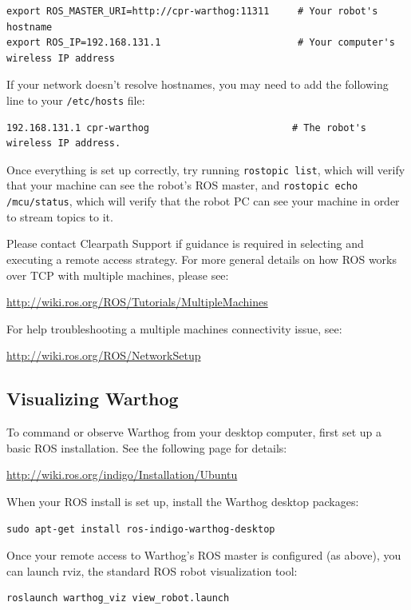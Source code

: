 \documentclass[]{clearpath-latex/clearpath-manual}
\begin{document}
\begin{lstlisting}
export ROS_MASTER_URI=http://cpr-warthog:11311     # Your robot's hostname
export ROS_IP=192.168.131.1                        # Your computer's wireless IP address
\end{lstlisting}

If your network doesn't resolve hostnames, you may need to add the following line to your \lstinline{/etc/hosts} file:

\begin{lstlisting}
192.168.131.1 cpr-warthog                         # The robot's wireless IP address.
\end{lstlisting}

Once everything is set up correctly, try running \lstinline{rostopic list}, which will verify that your machine can see the robot's ROS master, and \lstinline{rostopic echo /mcu/status}, which will verify that the robot PC can see your machine in order to stream topics to it.

Please contact Clearpath Support if guidance is required in selecting and executing a remote access strategy.
For more general details on how ROS works over TCP with multiple machines, please see:

\url{http://wiki.ros.org/ROS/Tutorials/MultipleMachines}

For help troubleshooting a multiple machines connectivity issue, see:

\url{http://wiki.ros.org/ROS/NetworkSetup}

\subsection{Visualizing Warthog}

To command or observe Warthog from your desktop computer, first set up a basic ROS installation.  See the following page for details:

\url{http://wiki.ros.org/indigo/Installation/Ubuntu}

When your ROS install is set up, install the Warthog desktop packages:

\begin{lstlisting}
sudo apt-get install ros-indigo-warthog-desktop
\end{lstlisting}

Once your remote access to Warthog's ROS master is configured (as above), you can launch rviz, the standard ROS robot visualization tool:

\begin{lstlisting}
roslaunch warthog_viz view_robot.launch
\end{lstlisting}
\end{document}
